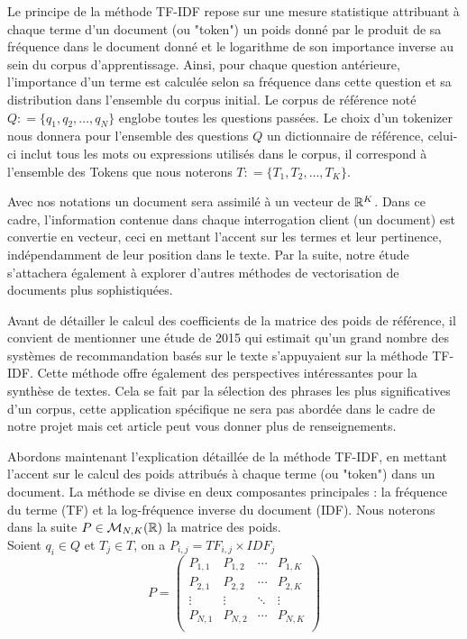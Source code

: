 \documentclass[12pt]{article}
\theoremstyle{definition}
\begin{document}
	Le principe de la méthode TF-IDF repose sur une mesure statistique attribuant à chaque terme d'un document (ou "token") un poids donné par le produit de sa fréquence dans le document donné et le logarithme de son importance inverse au sein du corpus d'apprentissage. Ainsi, pour chaque question antérieure, l'importance d'un terme est calculée selon sa fréquence dans cette question et sa distribution dans l'ensemble du corpus initial. Le corpus de référence noté $Q : = \{q_1,q_2,\dots,q_N\}$ englobe toutes les questions passées. Le choix d'un tokenizer nous donnera pour l'ensemble des questions $Q$ un dictionnaire de référence, celui-ci inclut tous les mots ou expressions utilisés dans le corpus, il correspond à l'ensemble des Tokens que nous noterons $T : = \{T_1,T_2,\dots,T_K\}$.
	
	Avec nos notations un document sera assimilé à un vecteur de $\mathbb{R}^K$. Dans ce cadre, l'information contenue dans chaque interrogation client (un document) est convertie en vecteur, ceci en mettant l'accent sur les termes et leur pertinence, indépendamment de leur position dans le texte. Par la suite, notre étude s'attachera également à explorer d'autres méthodes de vectorisation de documents plus sophistiquées.
	
	Avant de détailler le calcul des coefficients de la matrice des poids de référence, il convient de mentionner une étude de 2015 \cite{etude2015} qui estimait qu'un grand nombre des systèmes de recommandation basés sur le texte s'appuyaient sur la méthode TF-IDF. Cette méthode offre également des perspectives intéressantes pour la synthèse de textes. Cela se fait par la sélection des phrases les plus significatives d'un corpus, cette application spécifique ne sera pas abordée dans le cadre de notre projet mais cet article \cite{TFIDFsumup} peut vous donner plus de renseignements.
	
	Abordons maintenant l'explication détaillée de la méthode TF-IDF, en mettant l'accent sur le calcul des poids attribués à chaque terme (ou "token") dans un document. La méthode se divise en deux composantes principales : la fréquence du terme (TF) et la log-fréquence inverse du document (IDF). Nous noterons dans la suite $P\in \mathcal{M}_{N,K}(\mathbb{R})$ la matrice des poids.\\
	
	
	Soient $q_i\in Q$ et $T_j\in T$, on a $P_{i,j} = TF_{i,j}\times IDF_j$
	$$P = \begin{pmatrix}
		P_{1,1} & P_{1,2} & \cdots & P_{1,K} \\
		P_{2,1} & P_{2,2} & \cdots & P_{2,K} \\
		\vdots  & \vdots  & \ddots & \vdots  \\
		P_{N,1} & P_{N,2} & \cdots & P_{N,K} \\
	\end{pmatrix}$$
	
\end{document}

